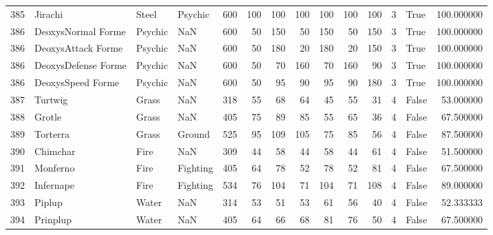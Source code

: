 \begin{tabular}{rlllrrrrrrrrlr}
 385 &                    Jirachi &     Steel &   Psychic &    600 &  100 &     100 &      100 &      100 &      100 &    100 &           3 &       True &  100.000000 \\
 386 &         DeoxysNormal Forme &   Psychic &       NaN &    600 &   50 &     150 &       50 &      150 &       50 &    150 &           3 &       True &  100.000000 \\
 386 &         DeoxysAttack Forme &   Psychic &       NaN &    600 &   50 &     180 &       20 &      180 &       20 &    150 &           3 &       True &  100.000000 \\
 386 &        DeoxysDefense Forme &   Psychic &       NaN &    600 &   50 &      70 &      160 &       70 &      160 &     90 &           3 &       True &  100.000000 \\
 386 &          DeoxysSpeed Forme &   Psychic &       NaN &    600 &   50 &      95 &       90 &       95 &       90 &    180 &           3 &       True &  100.000000 \\
 387 &                    Turtwig &     Grass &       NaN &    318 &   55 &      68 &       64 &       45 &       55 &     31 &           4 &      False &   53.000000 \\
 388 &                     Grotle &     Grass &       NaN &    405 &   75 &      89 &       85 &       55 &       65 &     36 &           4 &      False &   67.500000 \\
 389 &                   Torterra &     Grass &    Ground &    525 &   95 &     109 &      105 &       75 &       85 &     56 &           4 &      False &   87.500000 \\
 390 &                   Chimchar &      Fire &       NaN &    309 &   44 &      58 &       44 &       58 &       44 &     61 &           4 &      False &   51.500000 \\
 391 &                   Monferno &      Fire &  Fighting &    405 &   64 &      78 &       52 &       78 &       52 &     81 &           4 &      False &   67.500000 \\
 392 &                  Infernape &      Fire &  Fighting &    534 &   76 &     104 &       71 &      104 &       71 &    108 &           4 &      False &   89.000000 \\
 393 &                     Piplup &     Water &       NaN &    314 &   53 &      51 &       53 &       61 &       56 &     40 &           4 &      False &   52.333333 \\
 394 &                   Prinplup &     Water &       NaN &    405 &   64 &      66 &       68 &       81 &       76 &     50 &           4 &      False &   67.500000 \\

\end{tabular}

